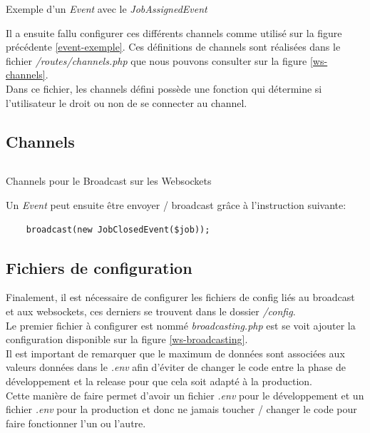 \documentclass[
    iai, %
    il, %
]{heig-tb}
\begin{document}
\begin{listing}[h]
    \inputminted{php}{assets/code/JobAssignedEvent.php}
    \caption{Exemple d'un \emph{Event} avec le \emph{JobAssignedEvent} \label{event-exemple}}
\end{listing}

Il a ensuite fallu configurer ces différents channels comme utilisé sur la figure précédente \ref{event-exemple}. Ces définitions de channels sont réalisées dans le fichier \emph{/routes/channels.php} que nous pouvons consulter sur la figure \ref{ws-channels}. \\
Dans ce fichier, les channels défini possède une fonction qui détermine si l'utilisateur le droit ou non de se connecter au channel.

\subsection{Channels}

\begin{listing}[h]
    \inputminted{php}{assets/code/channels.php}
    \caption{Channels pour le Broadcast sur les Websockets \label{ws-channels}}
\end{listing}

Un \emph{Event} peut ensuite être envoyer / \Gls{broadcast} grâce à l'instruction suivante:
\begin{lstlisting}
    broadcast(new JobClosedEvent($job));
\end{lstlisting}


\subsection{Fichiers de configuration}
Finalement, il est nécessaire de configurer les fichiers de config liés au \Gls{broadcast} et aux \Gls{websockets}, ces derniers se trouvent dans le dossier \emph{/config}. \\
Le premier fichier à configurer est nommé \emph{broadcasting.php} est se voit ajouter la configuration disponible sur la figure \ref{ws-broadcasting}. \\
Il est important de remarquer que le maximum de données sont associées aux valeurs données dans le \emph{.env} afin d'éviter de changer le code entre la phase de développement et la release pour que cela soit adapté à la production. \\
Cette manière de faire permet d'avoir un fichier \emph{.env} pour le développement et un fichier \emph{.env} pour la production et donc ne jamais toucher / changer le code pour faire fonctionner l'un ou l'autre.
\end{document}
